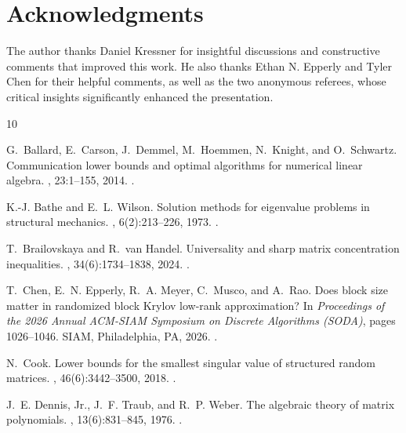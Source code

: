 \documentclass{article}
\begin{document}
\section*{Acknowledgments}
The author thanks Daniel Kressner for insightful discussions and constructive comments that improved this work. He also thanks Ethan N. Epperly and Tyler Chen for their helpful comments, as well as the two anonymous referees, whose critical insights significantly enhanced the presentation.



\begin{thebibliography}{10}

G.~Ballard, E.~Carson, J.~Demmel, M.~Hoemmen, N.~Knight, and O.~Schwartz.
\newblock Communication lower bounds and optimal algorithms for numerical
  linear algebra.
, 23:1--155, 2014.
\newblock \href {https://doi.org/10.1017/S0962492914000038}
  {}.

K.-J. Bathe and E.~L. Wilson.
\newblock Solution methods for eigenvalue problems in structural mechanics.
, 6(2):213--226, 1973.
\newblock \href {https://doi.org/10.1002/nme.1620060207}
  {}.

T.~Brailovskaya and R.~van Handel.
\newblock Universality and sharp matrix concentration inequalities.
, 34(6):1734--1838, 2024.
\newblock \href {https://doi.org/10.1007/s00039-024-00692-9}
  {}.

T.~Chen, E.~N. Epperly, R.~A. Meyer, C.~Musco, and A.~Rao.
\newblock Does block size matter in randomized block {K}rylov low-rank
  approximation?
\newblock In {\em Proceedings of the 2026 {A}nnual {ACM}-{SIAM} {S}ymposium on
  {D}iscrete {A}lgorithms ({SODA})}, pages 1026--1046. SIAM, Philadelphia, PA,
  2026.
\newblock \href {https://doi.org/10.1137/1.9781611978971.42}
  {}.

N.~Cook.
\newblock Lower bounds for the smallest singular value of structured random
  matrices.
, 46(6):3442--3500, 2018.
\newblock \href {https://doi.org/10.1214/17-AOP1251}
  {}.

J.~E. Dennis, Jr., J.~F. Traub, and R.~P. Weber.
\newblock The algebraic theory of matrix polynomials.
, 13(6):831--845, 1976.
\newblock \href {https://doi.org/10.1137/0713065} {}.


\end{thebibliography}
\end{document}
